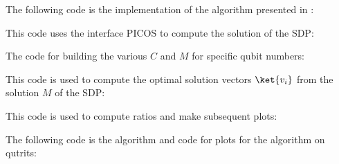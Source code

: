 The following code is the implementation of the algorithm presented in \cite{bravyi19}:

\bigskip
This code uses the interface PICOS to compute the solution of the SDP:

\bigskip
The code for building the various $C$ and $M$ for specific qubit numbers:

\bigskip
This code is used to compute the optimal solution vectors $\ket{v_i}$ from the solution $M$ of the SDP:

\bigskip
This code is used to compute ratios and make subsequent plots:

\bigskip
\newpage The following code is the algorithm and code for plots for the algorithm on qutrits:

